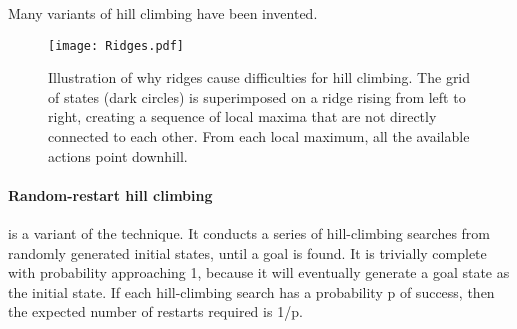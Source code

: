 Many variants of hill climbing have been invented.
\begin{figure}[h!t]
\centering
\texttt{[image: Ridges.pdf]}
\caption{Illustration of why ridges cause difficulties for hill climbing. The grid of states
(dark circles) is superimposed on a ridge rising from left to right, creating a sequence of local
maxima that are not directly connected to each other. From each local maximum, all the
available actions point downhill.}\label{ridges}
\end{figure}

\paragraph{Random-restart hill climbing} is a variant of the technique. 
It conducts a series of hill-climbing searches from randomly generated initial states, until a goal is found. It is trivially complete with probability approaching 1, because it will eventually generate a goal state as the initial state. If each hill-climbing search has a probability p of success, then the expected number of restarts required is 1/p.

